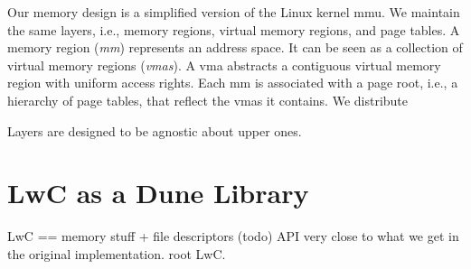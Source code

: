 Our memory design is a simplified version of the Linux kernel mmu.
We maintain the same layers, i.e., memory regions, virtual memory regions, and page tables.
A memory region (\textit{mm}) represents an address space.
It can be seen as a collection of virtual memory regions (\textit{vmas}).
A vma abstracts a contiguous virtual memory region with uniform access rights.
Each mm is associated with a page root, i.e., a hierarchy of page tables, that reflect the vmas it contains.
We distribute 

Layers are designed to be agnostic about upper ones.

\section{LwC as a Dune Library}
LwC == memory stuff + file descriptors (todo)
API
very close to what we get in the original implementation.
root LwC.



